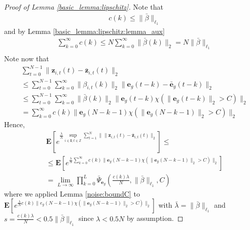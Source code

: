 \documentclass{article}
\def\rve{{\mathbf{e}}}
\def\rvz{{\mathbf{z}}}
\newcommand{\e}{\mathbf{e}}
\newcommand{\bE}{\mathbf{E}}
\begin{document}
\begin{proof}[Proof of Lemma \ref{basic_lemma:lipschitz}]
  Note that 
  \begin{align}
    &  c(k) 
    \le \|\bar{\beta}\|_{\ell_1}
      \label{basic_lemma:lipschitz:eq0.2} 
   \end{align}
    and by Lemma \ref{basic_lemma:lipschitz:lemma_aux}
    \begin{equation}
      \label{basic_lemma:lipschitz:eq1}
      \begin{aligned}
     & \sum_{k=0}^{\infty} c(k) \le N \sum_{k=0}^{\infty} \|\bar{\beta}(k)\|_2 = N \|\bar{\beta}\|_{\ell_1} \\
      \end{aligned}
    \end{equation}
    Note now that 
      \begin{align*}
      & \sum_{t=0}^{N-1}  \|\rvz_{i,t}(t)-\bar{\rvz}_{i,t}(t)\|_2  \\
      & \le
      \sum_{t=0}^{N-1}  \sum_{k=0}^{\infty} \|\beta_{i,t}(k)\|_2 \|\e_g(t-k)-\bar{\e}_g(t-k)\|_2 \\
      & \le \sum_{t=0}^{N-1}  \sum_{k=0}^{\infty} \|\bar{\beta}(k)\|_2 \|\e_g(t-k)\chi(\|\e_g(t-k)\|_2 > C)\|_2 \\
      & =\sum_{k=0}^{\infty} c(k) \|\e_g(N-k-1) \chi(\|\e_g(N-k-1)\|_2 > C)\|_2 
        \end{align*}    
        Hence,
        \begin{align*}
      &\bE[ e^{\frac{\lambda}{N} \sup_{i \in \mathbf{I}, t \in \mathbb{Z}} \sum_{t=1}^{N} \| \|\rvz_{i,t}(t)-\bar{\rvz}_{i,t}(t)\|_2}]
      \le \\
      & \le \bE[e^{\frac{\lambda}{N} \sum_{k=0}^{\infty} 
      c(k) \|\e_g(N-k-1) \chi(\|\e_g(N-k-1)\|_2 > C)\|_2}] \\
      & = \lim_{L \rightarrow \infty} 
      \prod_{k=0}^{L} \bar{\Psi}_{\rve_g}\left(\frac{c(k) \lambda}{N},\|\bar{\beta}\|_{\ell_1},C\right)
        \end{align*}
        where we applied  Lemma \ref{noise:boundC}
        to $\bE[e^{\frac{\lambda}{N} c(k)\|e_g(N-k-1) \chi(\|\e_g(N-k-1)\|_2 > C)\|_2}]$
        with $\bar{\lambda}=\|\bar{\beta}\|_{\ell_1}$ and $s=\frac{c(k)\lambda}{N} < 0.5\|\bar{\beta}\|_{\ell_1}$ since $\lambda<0.5N$ by assumption.


\end{proof}
\end{document}
